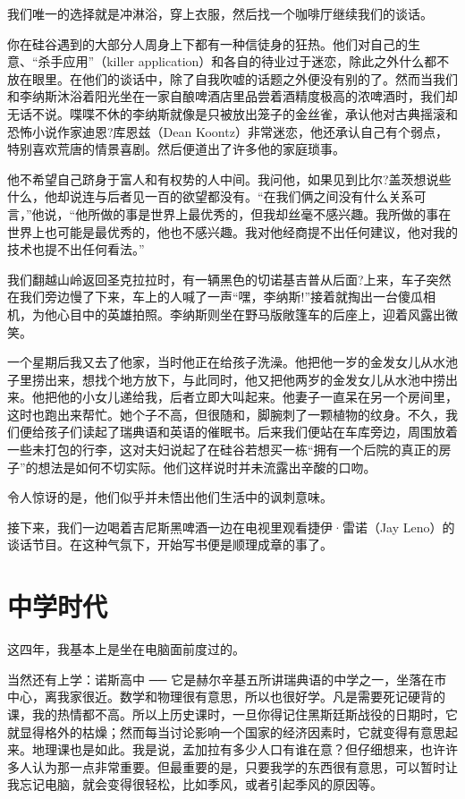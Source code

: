 我们唯一的选择就是冲淋浴，穿上衣服，然后找一个咖啡厅继续我们的谈话。

你在硅谷遇到的大部分人周身上下都有一种信徒身的狂热。他们对自己的生意、“杀手应用”（killer application）和各自的待业过于迷恋，除此之外什么都不放在眼里。在他们的谈话中，除了自我吹嘘的话题之外便没有别的了。然而当我们和李纳斯沐浴着阳光坐在一家自酿啤酒店里品尝着酒精度极高的浓啤酒时，我们却无话不说。喋喋不休的李纳斯就像是只被放出笼子的金丝雀，承认他对古典摇滚和恐怖小说作家迪恩?库恩兹（Dean Koontz）非常迷恋，他还承认自己有个弱点，特别喜欢荒唐的情景喜剧。然后便道出了许多他的家庭琐事。

他不希望自己跻身于富人和有权势的人中间。我问他，如果见到比尔?盖茨想说些什么，他却说连与后者见一百的欲望都没有。“在我们俩之间没有什么关系可言，”他说，“他所做的事是世界上最优秀的，但我却丝毫不感兴趣。我所做的事在世界上也可能是最优秀的，他也不感兴趣。我对他经商提不出任何建议，他对我的技术也提不出任何看法。”

我们翻越山岭返回圣克拉拉时，有一辆黑色的切诺基吉普从后面?上来，车子突然在我们旁边慢了下来，车上的人喊了一声“嘿，李纳斯!”接着就掏出一台傻瓜相机，为他心目中的英雄拍照。李纳斯则坐在野马版敞篷车的后座上，迎着风露出微笑。

一个星期后我又去了他家，当时他正在给孩子洗澡。他把他一岁的金发女儿从水池子里捞出来，想找个地方放下，与此同时，他又把他两岁的金发女儿从水池中捞出来。他把他的小女儿递给我，后者立即大叫起来。他妻子一直呆在另一个房间里，这时也跑出来帮忙。她个子不高，但很随和，脚腕刺了一颗植物的纹身。不久，我们便给孩子们读起了瑞典语和英语的催眠书。后来我们便站在车库旁边，周围放着一些未打包的行李，这对夫妇说起了在硅谷若想买一栋“拥有一个后院的真正的房子”的想法是如何不切实际。他们这样说时并未流露出辛酸的口吻。

令人惊讶的是，他们似乎并未悟出他们生活中的讽刺意味。

接下来，我们一边喝着吉尼斯黑啤酒一边在电视里观看捷伊·雷诺（Jay Leno）的谈话节目。在这种气氛下，开始写书便是顺理成章的事了。

 
\section{中学时代}

这四年，我基本上是坐在电脑面前度过的。

当然还有上学：诺斯高中 ── 它是赫尔辛基五所讲瑞典语的中学之一，坐落在市中心，离我家很近。数学和物理很有意思，所以也很好学。凡是需要死记硬背的课，我的热情都不高。所以上历史课时，一旦你得记住黑斯廷斯战役的日期时，它就显得格外的枯燥；然而每当讨论影响一个国家的经济因素时，它就变得有意思起来。地理课也是如此。我是说，孟加拉有多少人口有谁在意？但仔细想来，也许许多人认为那一点非常重要。但最重要的是，只要我学的东西很有意思，可以暂时让我忘记电脑，就会变得很轻松，比如季风，或者引起季风的原因等。

